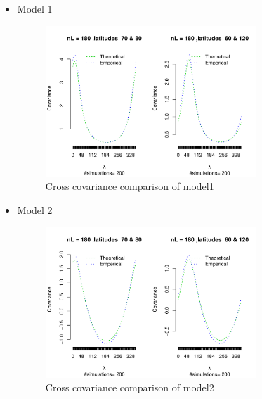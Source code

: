 \begin{itemize}
\item Model 1\\

\begin{figure}[H]
\begin{center}
\includegraphics [width=0.75\textwidth ]{graphs/Model1.pdf}
\caption{Cross covariance comparison of model1}
\end{center}
\end{figure}


\item Model 2
\begin{figure}[H]
\begin{center}
\includegraphics [width=0.75\textwidth ]{graphs/Model2.pdf}
\caption{Cross covariance comparison of model2}
\end{center}
\end{figure}



\end{itemize}
